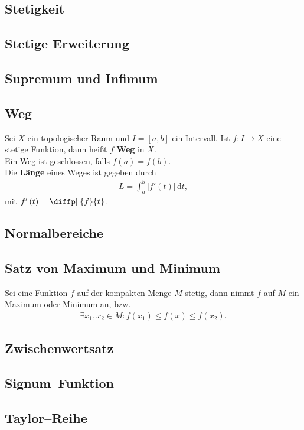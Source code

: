 \documentclass[a4paper,12pt]{article}
\newcommand{\td}{\,\text{d}}
\numberwithin{equation}{section}
\begin{document}
\subsection{Stetigkeit}
\subsection{Stetige Erweiterung}
\subsection{Supremum und Infimum}
\subsection{Weg}
Sei $X$ ein topologischer Raum und $I=\left[a,b\right]$ ein Intervall. Ist $f:I\rightarrow X$ eine stetige Funktion, dann heißt $f$ \textbf{Weg} in $X$.\\\indent
Ein Weg ist geschlossen, falls $f\left(a\right)=f\left(b\right)$.\\
Die \textbf{Länge} eines Weges ist gegeben durch
\begin{align} 
        L=\int_{a}^{b}|f'\left(t\right)|\td t
,\end{align} 
mit $f'\left(t\right)=\diffp[]{f}{t}$.

\subsection{Normalbereiche}
\subsection{Satz von Maximum und Minimum}
Sei eine Funktion $f$ auf der kompakten Menge $M$ stetig, dann nimmt $f$ auf $M$ ein Maximum oder Minimum an, bzw.\
\begin{align} 
        \exists x_1,x_2 \in M:f\left(x_1\right)\leq f\left(x\right)\leq f\left(x_2\right)\label{eq:satz von maximum und minimum}
.\end{align} 

\subsection{Zwischenwertsatz}
\subsection{Signum--Funktion}
\subsection{Taylor--Reihe}
\end{document}
